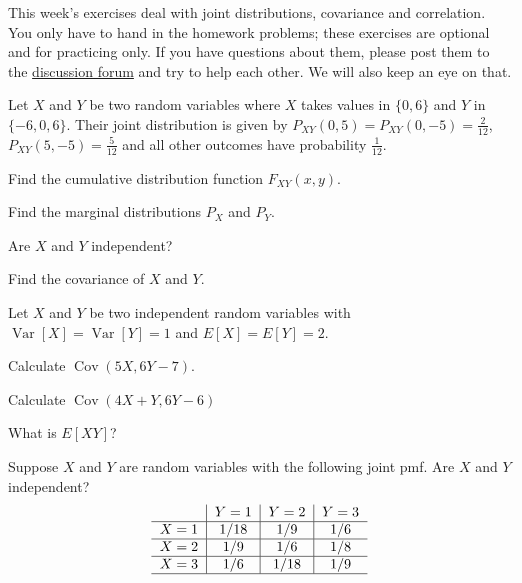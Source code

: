 \documentclass[a4paper,10pt,landscape,twocolumn]{scrartcl}
\DeclareMathOperator{\Cov}{Cov}
\DeclareMathOperator{\Var}{Var}
\begin{document}
\practiceproblems

{\sffamily\noindent
This week's exercises deal with joint distributions, covariance and correlation. You only have to hand in the homework problems; these exercises are optional and for practicing only. 
If you have questions about them, please post them to the \href{\discussionForumURL}{discussion forum} and try to help each other. We will also keep an eye on that.
}


\begin{exercise}[]
	Let $X$ and $Y$ be two random variables where $X$ takes values in $\{0, 6\}$ and $Y$ in $\{-6, 0, 6\}$. Their joint distribution is given by $P_{XY}(0,5) = P_{XY}(0, -5) = \frac{2}{12}$, $P_{XY}(5,-5) = \frac{5}{12}$ and all other outcomes have probability $\frac{1}{12}$. 
	
	\begin{subex}
	Find the cumulative distribution function $F_{XY}(x,y)$.	
	\end{subex}
		
	\begin{subex}
	Find the marginal distributions $P_X$ and $P_Y$.	
	\end{subex}
	
	\begin{subex}
	Are $X$ and $Y$ independent?	
	\end{subex}
	
	\begin{subex}
	Find the covariance of $X$ and $Y$.
	\end{subex}
\end{exercise}

\begin{exercise}[]
	Let $X$ and $Y$ be two independent random variables with $\Var[X] = \Var[Y] = 1$ and $E[X] = E[Y] = 2$.
	\begin{subex}
		Calculate $\Cov(5X,6Y - 7)$.
	\end{subex}
	\begin{subex}
		Calculate $\Cov(4X + Y, 6Y-6)$	
	\end{subex}
	
	\begin{subex}
		What is $E[XY]$?	
	\end{subex}
\end{exercise}

\begin{subex}
Suppose $X$ and $Y$ are random variables with the following joint pmf. Are $X$ and $Y$ independent?
	\[
	\begin{tabular}{c|c|c|c}
			&$Y=1$	&$Y=2$	&$Y=3$\\\hline
	$X=1$	&$1/18$	&$1/9$	&$1/6$ \\\hline
	$X=2$	&$1/9$	&$1/6$	&$1/8$ \\\hline
	$X=3$	&$1/6$	&$1/18$	&$1/9$  \\\hline
	\end{tabular}
	\]
\end{subex}
\end{document}
